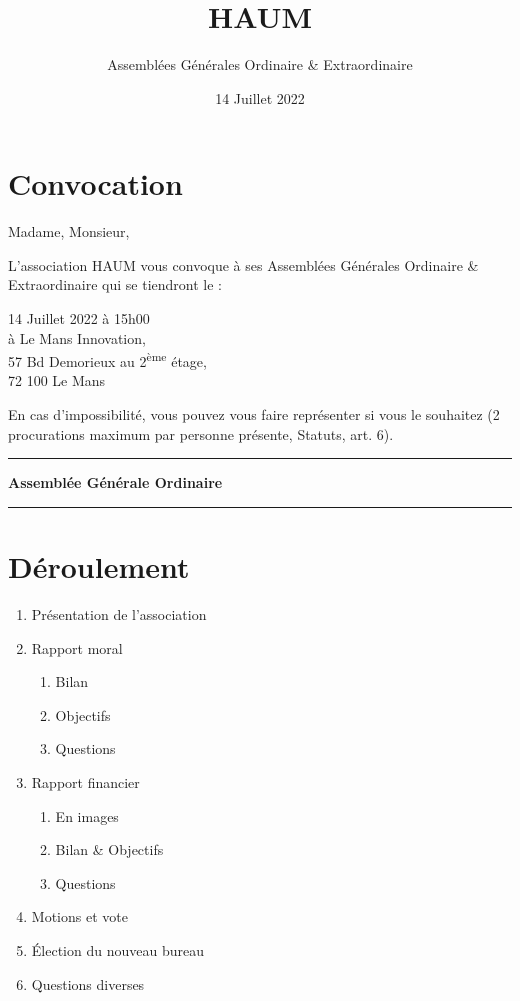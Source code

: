 \documentclass[11pt]{article}
\title{HAUM}
\author{Assemblées Générales Ordinaire \& Extraordinaire}
\date{14 Juillet 2022}
\begin{document}
\maketitle

\section*{Convocation}

Madame, Monsieur,

L'association HAUM vous convoque à ses Assemblées Générales Ordinaire \& Extraordinaire qui se tiendront le :

\begin{center}
{\Large 14 Juillet 2022 à 15h00}\\
à Le Mans Innovation, \\57 Bd Demorieux au 2\textsuperscript{ème} étage, \\72 100 Le Mans
\end{center}

En cas d'impossibilité, vous pouvez vous faire représenter si vous le souhaitez (2 procurations maximum par personne présente, Statuts, art. 6).

\newpage

\hrule
\vspace{.6cm}
\begin{center}
\Large\bfseries Assemblée Générale Ordinaire
\end{center}
\vspace{.3cm}
\hrule

\vspace{1.5cm}

\section*{Déroulement}

\begin{enumerate}
    \item Présentation de l'association
    \item Rapport moral
        \begin{enumerate}
            \item Bilan
            \item Objectifs
            \item Questions
        \end{enumerate}
    \item Rapport financier
        \begin{enumerate}
						\item En images
            \item Bilan \& Objectifs
            \item Questions
        \end{enumerate}
    \item Motions et vote
    \item Élection du nouveau bureau
    \item Questions diverses
\end{enumerate}
\end{document}
